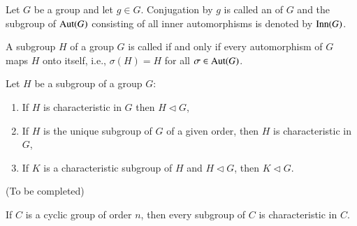 \documentclass[12pt, a4paper, twoside, openright, titlepage]{book}
\begin{document}
\begin{defn}{}{}
    Let $G$ be a group and let $g \in G$. Conjugation by $g$ is called an  of $G$ and the subgroup of $\operatorname{Aut}(G)$ consisting of all inner automorphisms is denoted by $\operatorname{Inn}(G)$.
\end{defn}


\begin{defn}{}{}
    A subgroup $H$ of a group $G$ is called  if and only if every automorphism of $G$ maps $H$ onto itself, i.e., $\sigma(H) = H$ for all $\sigma \in \operatorname{Aut}(G)$.
\end{defn}


\begin{prop}
    Let $H$ be a subgroup of a group $G$: \begin{enumerate}
        \item If $H$ is characteristic in $G$ then $H \vartriangleleft G$,
        \item If $H$ is the unique subgroup of $G$ of a given order, then $H$ is characteristic in $G$,
        \item If $K$ is a characteristic subgroup of $H$ and $H \vartriangleleft G$, then $K\vartriangleleft G$.
    \end{enumerate}
\end{prop}
\begin{proof*}{}{}
    (To be completed)
\end{proof*}


\begin{cor}{}{}
    If $C$ is a cyclic group of order $n$, then every subgroup of $C$ is characteristic in $C$.
\end{cor}
\end{document}
